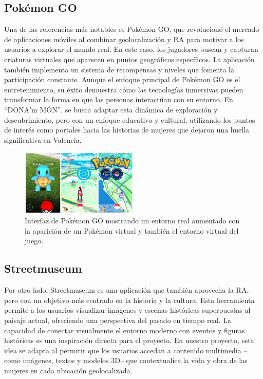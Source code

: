\subsection{Pokémon GO}

Una de las referencias más notables es Pokémon GO, que revolucionó el mercado de aplicaciones móviles al combinar geolocalización y RA para motivar a los usuarios a explorar el mundo real. En este caso, los jugadores buscan y capturan criaturas virtuales que aparecen en puntos geográficos específicos. La aplicación también implementa un sistema de recompensas y niveles que fomenta la participación constante. Aunque el enfoque principal de Pokémon GO es el entretenimiento, su éxito demuestra cómo las tecnologías inmersivas pueden transformar la forma en que las personas interactúan con su entorno. En “DONA’m MÓN”, se busca adaptar esta dinámica de exploración y descubrimiento, pero con un enfoque educativo y cultural, utilizando los puntos de interés como portales hacia las historias de mujeres que dejaron una huella significativa en Valencia.

\begin{figure}[H]
    \centering
    \includegraphics[width=0.5\textwidth]{figs/pokemon_go.jpg}
    \caption{Interfaz de Pokémon GO mostrando un entorno real aumentado con la aparición de un Pokémon virtual y también el entorno virtual del juego.}
    \label{fig:pokemon_go}
\end{figure}

\subsection{Streetmuseum}

Por otro lado, Streetmuseum es una aplicación que también aprovecha la RA, pero con un objetivo más centrado en la historia y la cultura. Esta herramienta permite a los usuarios visualizar imágenes y escenas históricas superpuestas al paisaje actual, ofreciendo una perspectiva del pasado en tiempo real. La capacidad de conectar visualmente el entorno moderno con eventos y figuras históricas es una inspiración directa para el proyecto. En nuestro proyecto, esta idea se adapta al permitir que los usuarios accedan a contenido multimedia –como imágenes, textos y modelos 3D– que contextualice la vida y obra de las mujeres en cada ubicación geolocalizada.

